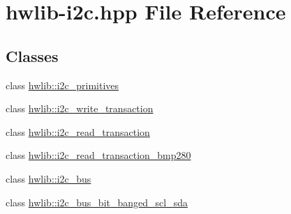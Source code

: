 \hypertarget{hwlib-i2c_8hpp}{}\section{hwlib-\/i2c.hpp File Reference}
\label{hwlib-i2c_8hpp}
\subsection*{Classes}
\begin{DoxyCompactItemize}
\item 
class \mbox{\hyperlink{classhwlib_1_1i2c__primitives}{hwlib\+::i2c\+\_\+primitives}}
\item 
class \mbox{\hyperlink{classhwlib_1_1i2c__write__transaction}{hwlib\+::i2c\+\_\+write\+\_\+transaction}}
\item 
class \mbox{\hyperlink{classhwlib_1_1i2c__read__transaction}{hwlib\+::i2c\+\_\+read\+\_\+transaction}}
\item 
class \mbox{\hyperlink{classhwlib_1_1i2c__read__transaction__bmp280}{hwlib\+::i2c\+\_\+read\+\_\+transaction\+\_\+bmp280}}
\item 
class \mbox{\hyperlink{classhwlib_1_1i2c__bus}{hwlib\+::i2c\+\_\+bus}}
\item 
class \mbox{\hyperlink{classhwlib_1_1i2c__bus__bit__banged__scl__sda}{hwlib\+::i2c\+\_\+bus\+\_\+bit\+\_\+banged\+\_\+scl\+\_\+sda}}
\end{DoxyCompactItemize}
